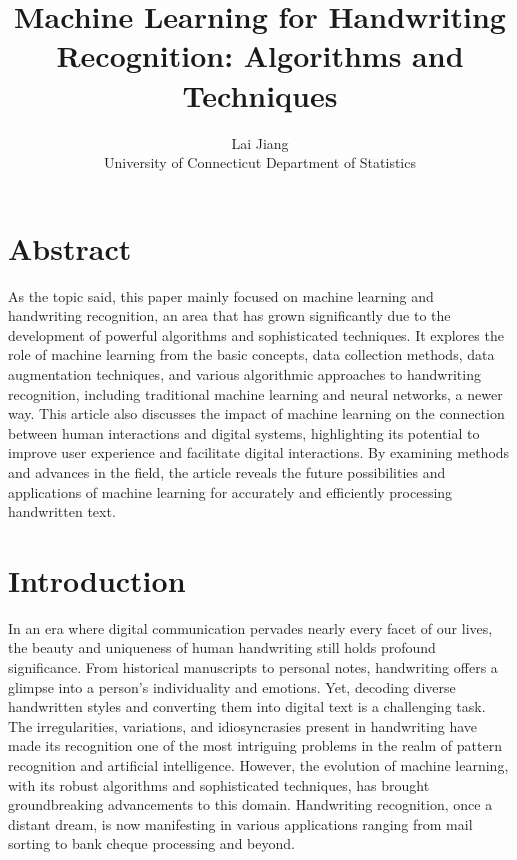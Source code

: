 \documentclass[12pt]{article}
\title{Machine Learning for Handwriting Recognition: Algorithms and Techniques}
\author{Lai Jiang\\
  University of Connecticut Department of Statistics
}
\begin{document}
\maketitle

\section* {Abstract}
As the topic said, this paper mainly focused on machine learning and handwriting recognition, an area that has grown significantly due to the development of powerful algorithms and sophisticated techniques. It explores the role of machine learning from the basic concepts, data collection methods, data augmentation techniques, and various algorithmic approaches to handwriting recognition, including traditional machine learning and neural networks, a newer way. This article also discusses the impact of machine learning on the connection between human interactions and digital systems, highlighting its potential to improve user experience and facilitate digital interactions. By examining methods and advances in the field, the article reveals the future possibilities and applications of machine learning for accurately and efficiently processing handwritten text.


\section* {Introduction}
In an era where digital communication pervades nearly every facet of our lives, the beauty and uniqueness of human handwriting still holds profound significance. From historical manuscripts to personal notes, handwriting offers a glimpse into a person's individuality and emotions. Yet, decoding diverse handwritten styles and converting them into digital text is a challenging task. The irregularities, variations, and idiosyncrasies present in handwriting have made its recognition one of the most intriguing problems in the realm of pattern recognition and artificial intelligence. However, the evolution of machine learning, with its robust algorithms and sophisticated techniques, has brought groundbreaking advancements to this domain. Handwriting recognition, once a distant dream, is now manifesting in various applications ranging from mail sorting to bank cheque processing and beyond. 
\end{document}
